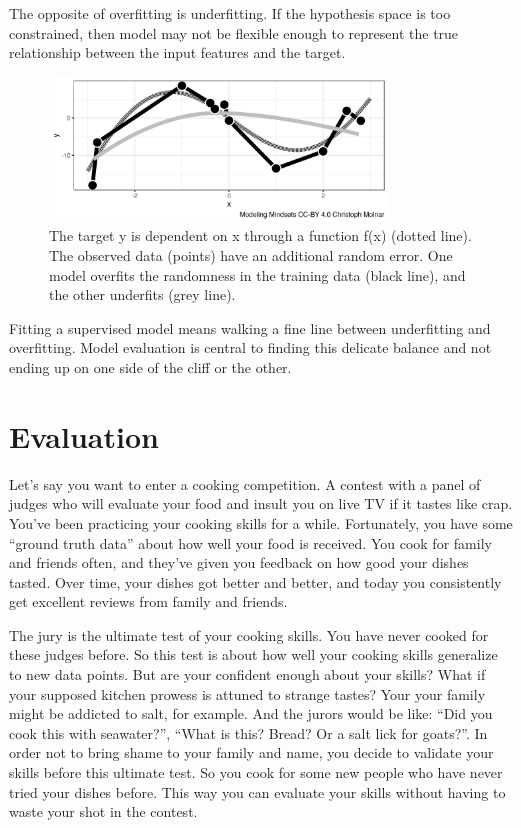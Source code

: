 \documentclass[
  10pt,
]{scrbook}
\begin{document}
The opposite of overfitting is underfitting.
If the hypothesis space is too constrained, then model may not be flexible enough to represent the true relationship between the input features and the target.

\begin{figure}

{\centering \includegraphics[width=0.8\textwidth]{figures/underoverfitting-1} 

}

\caption{The target y is dependent on x through a function f(x) (dotted line). The observed data (points) have an additional random error. One model overfits the randomness in the training data (black line), and the other underfits (grey line).}\label{fig:underoverfitting}
\end{figure}

Fitting a supervised model means walking a fine line between underfitting and overfitting.
Model evaluation is central to finding this delicate balance and not ending up on one side of the cliff or the other.

\hypertarget{evaluation}{%
\section{Evaluation}\label{evaluation}}

Let's say you want to enter a cooking competition.
A contest with a panel of judges who will evaluate your food and insult you on live TV if it tastes like crap.
You've been practicing your cooking skills for a while.
Fortunately, you have some ``ground truth data'' about how well your food is received.
You cook for family and friends often, and they've given you feedback on how good your dishes tasted.
Over time, your dishes got better and better, and today you consistently get excellent reviews from family and friends.

The jury is the ultimate test of your cooking skills.
You have never cooked for these judges before.
So this test is about how well your cooking skills generalize to new data points.
But are your confident enough about your skills?
What if your supposed kitchen prowess is attuned to strange tastes?
Your your family might be addicted to salt, for example.
And the jurors would be like: ``Did you cook this with seawater?'', ``What is this? Bread? Or a salt lick for goats?''.
In order not to bring shame to your family and name, you decide to validate your skills before this ultimate test.
So you cook for some new people who have never tried your dishes before.
This way you can evaluate your skills without having to waste your shot in the contest.
\end{document}
